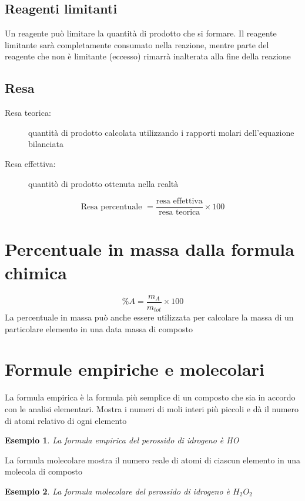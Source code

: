 \documentclass[a4paper,11pt]{report}
\newtheorem*{es}{Esempio}
\begin{document}
\subsection*{Reagenti limitanti}
Un reagente può limitare la quantità di prodotto che si formare. Il reagente limitante sarà completamente consumato nella reazione, mentre parte del reagente che non è limitante (eccesso) rimarrà inalterata alla fine della reazione 

\subsection*{Resa}
\begin{description}
	\item[Resa teorica:] quantità di prodotto calcolata utilizzando i rapporti molari dell'equazione bilanciata 
 \item[Resa effettiva:] quantitò di prodotto ottenuta nella realtà
\end{description}

\[\text{Resa percentuale } = \frac{\text{resa effettiva}}{\text{resa teorica}} \times 100 \]

\section{Percentuale in massa dalla formula chimica}
\begin{equation*}
	\% A = \frac{m_A}{m_{tot}} \times 100
\end{equation*}
La percentuale in massa può anche essere utilizzata per calcolare la massa di un particolare elemento in una data massa di composto

\section{Formule empiriche e molecolari}
La formula empirica è la formula più semplice di un composto che sia in accordo con le analisi elementari. Mostra i numeri di moli interi più piccoli e dà il numero di atomi relativo di ogni elemento 

\begin{es}
	La formula empirica del perossido di idrogeno è HO
\end{es}

\noindent La formula molecolare mostra il numero reale di atomi di ciascun elemento in una molecola di composto

\begin{es}
	La formula molecolare del perossido di idrogeno è $H_2O_2$
\end{es}
\end{document}
